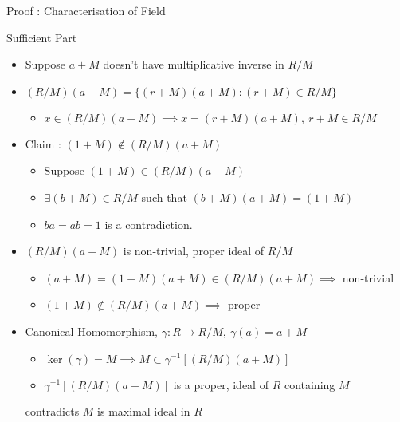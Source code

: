 \documentclass{beamer}
\begin{document}
\begin{frame}{Proof : Characterisation of Field}
\begin{block}{Sufficient Part}
\begin{itemize}
	\item Suppose $a+M$ doesn't have multiplicative inverse in $R/M$
	\item $(R/M)(a+M) = \{ (r+M)(a+M) : (r+M) \in R/M \}$
\begin{itemize}
	\item $x \in (R/M)(a+M) \implies x = (r+M)(a+M),\ r+M \in R/M$
\end{itemize}
	\item Claim : $(1+M) \notin (R/M)(a+M)$
\begin{itemize}
	\item Suppose $(1+M) \in (R/M)(a+M)$
	\item $\exists (b+M) \in R/M$ such that $(b+M)(a+M) = (1+M)$
	\item $ba = ab = 1$ is a contradiction.
\end{itemize}
	\item $(R/M)(a+M)$ is non-trivial, proper ideal of $R/M$
\begin{itemize}
	\item $(a+M) = (1+M)(a+M) \in (R/M)(a+M) \implies $ non-trivial
	\item $(1+M) \notin (R/M)(a+M) \implies$ proper
\end{itemize}
	\item  Canonical Homomorphism, $\gamma : R \to R/M,\ \gamma(a) = a+M$
\begin{itemize}
	\item $\ker(\gamma) = M \implies M \subset \gamma^{-1}[(R/M)(a+M)]$
	\item $\gamma^{-1}[(R/M)(a+M)]$ is a proper, ideal of $R$ containing $M$
\end{itemize}
	contradicts $M$ is maximal ideal in $R$
\end{itemize}
\end{block}
\end{frame}
\end{document}
